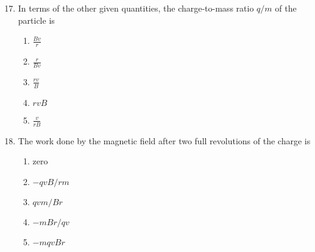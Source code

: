 \documentclass[11pt]{article}
\begin{document}
\begin{multicols}{2}
  \begin{enumerate}[leftmargin=18pt]
    \setcounter{enumi}{16}

  \item In terms of the other given quantities, the charge-to-mass ratio $q/m$
    of the particle is
    \begin{enumerate}[noitemsep,topsep=0pt,leftmargin=18pt,label=(\Alph*)]
    \item $\displaystyle\frac{Bv}{r}$
    \item $\displaystyle\frac{r}{Bv}$
    \item $\displaystyle\frac{rv}{B}$
    \item $rvB$
    \item $\displaystyle\frac{v}{rB}$
    \end{enumerate}
    
  \item The work done by the magnetic field after two full revolutions of the
    charge is
    \begin{enumerate}[noitemsep,topsep=0pt,leftmargin=18pt,label=(\Alph*)]
    \item zero
    \item $-qvB/rm$
    \item $qvm/Br$
    \item $-mBr/qv$
    \item $-mqvBr$
    \end{enumerate}

    \columnbreak
    


\end{enumerate}
\end{multicols}
\end{document}
